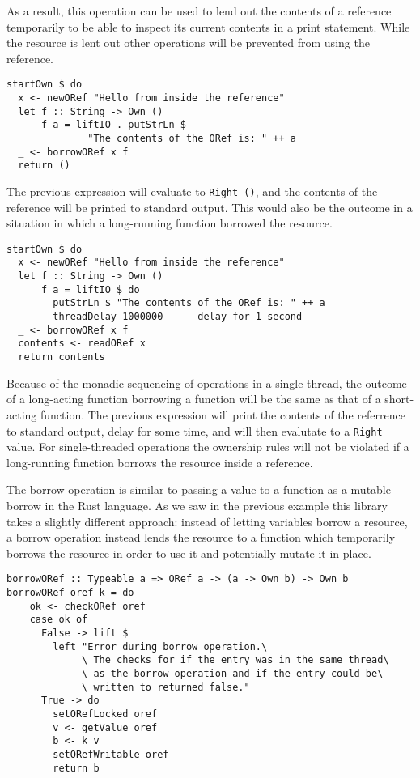 \documentclass[onehalf,11pt]{beavtex}
\begin{document}
As a result, this operation can be used to lend out the contents of a reference
temporarily to be able to inspect its current contents in a print statement.
While the resource is lent out other operations will be prevented from using the
reference.

\begin{lstlisting}
startOwn $ do
  x <- newORef "Hello from inside the reference"
  let f :: String -> Own ()
      f a = liftIO . putStrLn $
              "The contents of the ORef is: " ++ a
  _ <- borrowORef x f
  return ()
\end{lstlisting}

The previous expression will evaluate to \texttt{Right ()}, and the contents
of the reference will be printed to standard output.
This would also be the outcome in a situation in which a long-running function
borrowed the resource.

\begin{lstlisting}
startOwn $ do
  x <- newORef "Hello from inside the reference"
  let f :: String -> Own ()
      f a = liftIO $ do
        putStrLn $ "The contents of the ORef is: " ++ a
        threadDelay 1000000   -- delay for 1 second
  _ <- borrowORef x f
  contents <- readORef x
  return contents
\end{lstlisting}

Because of the monadic sequencing of operations in a single thread, the outcome
of a long-acting function borrowing a function will be the same as that of a
short-acting function.
The previous expression will print the contents of the referrence to standard
output, delay for some time, and will then evalutate to a \texttt{Right} value.
For single-threaded operations the ownership rules will not be violated if
a long-running function borrows the resource inside a reference.

The borrow operation is similar to passing a value to a function as a mutable
borrow in the Rust language.
As we saw in the previous example this library takes a slightly different
approach: instead of letting variables borrow a resource, a borrow operation
instead lends the resource to a function which temporarily borrows the resource
in order to use it and potentially mutate it in place.

\begin{verbatim}
borrowORef :: Typeable a => ORef a -> (a -> Own b) -> Own b
borrowORef oref k = do
    ok <- checkORef oref
    case ok of
      False -> lift $
        left "Error during borrow operation.\
             \ The checks for if the entry was in the same thread\
             \ as the borrow operation and if the entry could be\
             \ written to returned false."
      True -> do
        setORefLocked oref
        v <- getValue oref
        b <- k v
        setORefWritable oref
        return b
\end{verbatim}
\end{document}
